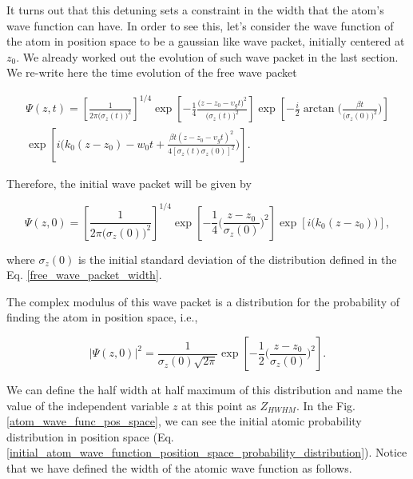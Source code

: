 \documentclass{article}
\begin{document}
It turns out that this detuning sets a constraint in the width that the atom's wave function can have. In order to see this,
let's consider the wave function of the atom in position space to be a gaussian like wave packet, initially centered at $z_{0}$. We already worked out the evolution of such wave packet in the last section. We re-write here the time evolution of the free wave packet

\begin{multline}\label{atom_wave_function_position_space}
    \Psi (z, t) = \left[\frac{1}{2 \pi \big(\sigma_{z}(t)\big)^2} \right]^{1/4} \exp \left[-\frac{1}{4} \frac{ \big(z - z_{0} - \upsilon_{g} t \big)^{2}}{\big(\sigma_{z}(t)\big)^{2}} \right] \exp \left[-\frac{i}{2} \arctan\Bigg(\frac{\beta t }{\big(\sigma_{z}(0)\big)^{2}}\Bigg) \right] \\ \exp \left[i \bigg(k_{0}(z-z_{0}) - w_{0}t + \frac{ \beta t (z - z_{0} - \upsilon_{g} t)^{2}}{ 4[\sigma_{z}(t)\sigma_{z}(0)]^{2}} \bigg) \right].
\end{multline}

Therefore, the initial wave packet will be given by

\begin{equation}\label{initial_atom_wave_function_position_space}
    \Psi (z, 0) = \left[\frac{1}{2 \pi \big(\sigma_{z}(0)\big)^2} \right]^{1/4} \exp \left[-\frac{1}{4}\bigg(\frac{z-z_{0}}{\sigma_{z}(0)}\bigg)^{2} \right] \exp \left[i \bigg(k_{0}(z-z_{0})\bigg) \right],
\end{equation}

where $\sigma_{z}(0)$ is the initial standard deviation of the distribution defined in the Eq. \ref{free_wave_packet_width}.

The complex modulus of this wave packet is a distribution for the probability of finding the atom in position space, i.e.,

\begin{equation}\label{initial_atom_wave_function_position_space_probability_distribution}
    |\Psi (z, 0)|^{2} = \frac{1}{\sigma_{z}(0) \sqrt{2 \pi}} \exp \left[-\frac{1}{2}\bigg(\frac{z-z_{0}}{\sigma_{z}(0)}\bigg)^{2} \right].
\end{equation}

We can define the half width at half maximum of this distribution and name the value of the independent variable $z$ at this point as $Z_{HWHM}$. In the Fig. \ref{atom_wave_func_pos_space}, we can see the initial atomic probability distribution in position space (Eq. \ref{initial_atom_wave_function_position_space_probability_distribution}). Notice that we have defined the width of the atomic wave function as follows.
\end{document}
